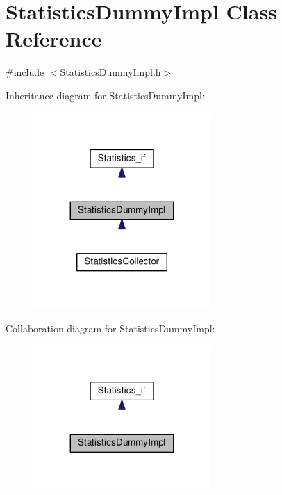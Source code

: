 \hypertarget{class_statistics_dummy_impl}{}\section{Statistics\+Dummy\+Impl Class Reference}
\label{class_statistics_dummy_impl}


{\ttfamily \#include $<$Statistics\+Dummy\+Impl.\+h$>$}



Inheritance diagram for Statistics\+Dummy\+Impl\+:
\nopagebreak
\begin{figure}[H]
\begin{center}
\leavevmode
\includegraphics[width=191pt]{class_statistics_dummy_impl__inherit__graph}
\end{center}
\end{figure}


Collaboration diagram for Statistics\+Dummy\+Impl\+:
\nopagebreak
\begin{figure}[H]
\begin{center}
\leavevmode
\includegraphics[width=191pt]{class_statistics_dummy_impl__coll__graph}
\end{center}
\end{figure}
